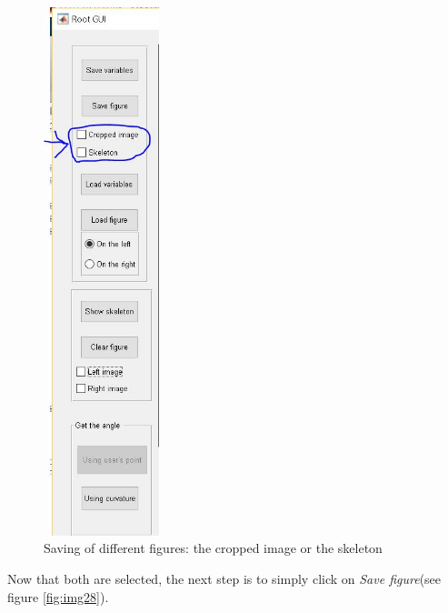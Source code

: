 \begin{figure}[H]
	\centering
	\includegraphics[width=0.3\textwidth]{../Figures/manual/save4.jpg}
	\caption{Saving of different figures: the cropped image or the skeleton}
	\label{fig:img27}
\end{figure}

Now that both are selected, the next step is to simply click on \textit{Save figure}(see figure \ref{fig:img28}).

